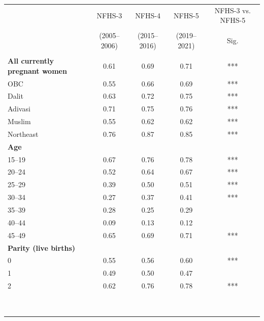 \begin{tabular}{lcccc}
\toprule
 & \multicolumn{1}{c}{NFHS-3} & \multicolumn{1}{c}{NFHS-4} & \multicolumn{1}{c}{NFHS-5} & \multicolumn{1}{c}{NFHS-3 vs. NFHS-5} \\\\
 & \multicolumn{1}{c}{(2005--2006)} & \multicolumn{1}{c}{(2015--2016)} & \multicolumn{1}{c}{(2019--2021)} & \multicolumn{1}{c}{Sig.} \\\\
\midrule
\textbf{All currently pregnant women}&0.61&0.69&0.71&***\\
\hspace*{2em}OBC&0.55&0.66&0.69&***\\
\hspace*{2em}Dalit&0.63&0.72&0.75&***\\
\hspace*{2em}Adivasi&0.71&0.75&0.76&***\\
\hspace*{2em}Muslim&0.55&0.62&0.62&***\\
\hspace*{2em}Northeast&0.76&0.87&0.85&***\\
\textbf{Age}&&&&\\
\hspace*{2em}15--19&0.67&0.76&0.78&***\\
\hspace*{2em}20--24&0.52&0.64&0.67&***\\
\hspace*{2em}25--29&0.39&0.50&0.51&***\\
\hspace*{2em}30--34&0.27&0.37&0.41&***\\
\hspace*{2em}35--39&0.28&0.25&0.29&\\
\hspace*{2em}40--44&0.09&0.13&0.12&\\
\hspace*{2em}45--49&0.65&0.69&0.71&***\\
\textbf{Parity (live births)}&&&&\\
\hspace*{2em}0&0.55&0.56&0.60&***\\
\hspace*{2em}1&0.49&0.50&0.47&\\
\hspace*{2em}2&0.62&0.76&0.78&***\\
&&&&\\
&&&&\\
&&&&\\
&&&&\\
&&&&\\
&&&&\\
&&&&\\
&&&&\\
&&&&\\
\bottomrule
\end{tabular}

